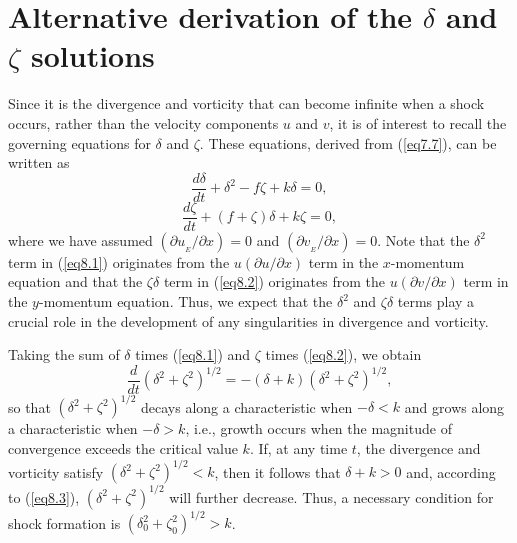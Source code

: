 \documentclass[10pt]{article}
\begin{document}
\section{Alternative derivation of the $\delta$ and $\zeta$ solutions}   %

    Since it is the divergence and vorticity that can become infinite when a shock occurs, rather than
the velocity components $u$ and $v$, it is of interest to recall the governing equations
for $\delta$ and $\zeta$. These equations, derived from (\ref{eq7.7}), can be written as
\begin{equation}                                    %
     \frac{d\delta}{dt} + \delta^2 - f\zeta + k\delta = 0,
\label{eq8.1}
\end{equation}
\begin{equation}                                    %
     \frac{d\zeta}{dt} + (f + \zeta)\delta + k\zeta = 0,
\label{eq8.2}
\end{equation}
where we have assumed $(\partial u_{_E}/\partial x)=0$ and
$(\partial v_{_E}/\partial x)=0$. Note that the $\delta^2$ term
in (\ref{eq8.1}) originates from the $u(\partial u/\partial x)$ term in the
$x$-momentum equation and that the $\zeta\delta$ term in (\ref{eq8.2}) originates
from the $u(\partial v/\partial x)$ term in the $y$-momentum equation. Thus, we
expect that the $\delta^2$ and $\zeta\delta$ terms play a crucial role in the
development of any singularities in divergence and vorticity.

     Taking the sum of $\delta$ times (\ref{eq8.1}) and $\zeta$ times (\ref{eq8.2}),
we obtain
\begin{equation}                                    %
         \frac{d}{dt}\left(\delta^2 + \zeta^2\right)^{1/2}
      = -(\delta + k)\left(\delta^2 + \zeta^2\right)^{1/2},
\label{eq8.3}
\end{equation}
so that $(\delta^2+\zeta^2)^{1/2}$ decays along a characteristic when $-\delta < k$
and grows along a characteristic when $-\delta > k$, i.e., growth occurs when
the magnitude of convergence exceeds the critical value $k$.
If, at any time $t$, the divergence and vorticity satisfy $(\delta^2+\zeta^2)^{1/2} < k$,
then it follows that $\delta + k > 0$ and, according to (\ref{eq8.3}),
$(\delta^2+\zeta^2)^{1/2}$ will further decrease. Thus, a necessary condition
for shock formation is $(\delta_0^2+\zeta_0^2)^{1/2} > k$.
\end{document}
